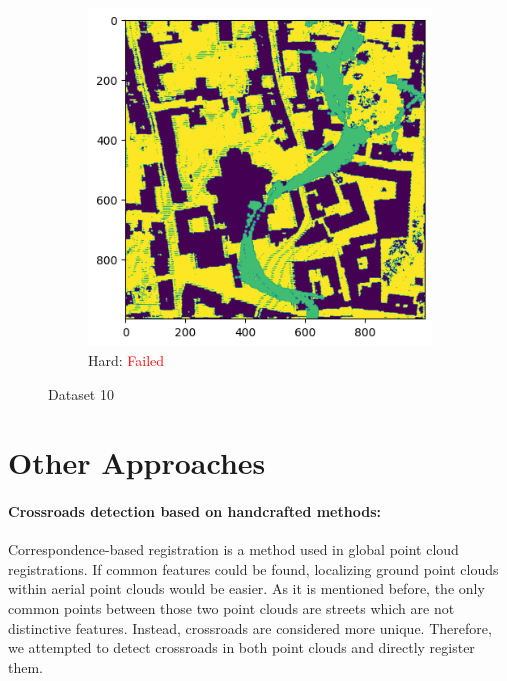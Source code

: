 \documentclass[11pt]{article}
\begin{document}
\begin{figure}[p]
        \vspace{1em}

        \begin{subfigure}{0.45\textwidth}
            \centering
            \includegraphics[width=\linewidth]{images/full/hard/5_2_3_hard}
            \caption{Hard: \textcolor{red}{Failed}}
            \label{fig:5_2_3_hard}
        \end{subfigure}
        \hfill

        \caption{Dataset 10}
        \label{fig:res_5_2_3}
    \end{figure}

    \clearpage

    

    \section{Other Approaches}
    \paragraph{Crossroads detection based on handcrafted methods:}
    Correspondence-based registration is a method used in global point cloud registrations. If common features
    could be found, localizing ground point clouds within aerial point clouds would be easier. As it is mentioned
    before, the only common points between those two point clouds are streets which are not distinctive features.
    Instead, crossroads are considered more unique. Therefore, we attempted to detect crossroads in both
    point clouds and directly register them.
\end{document}
